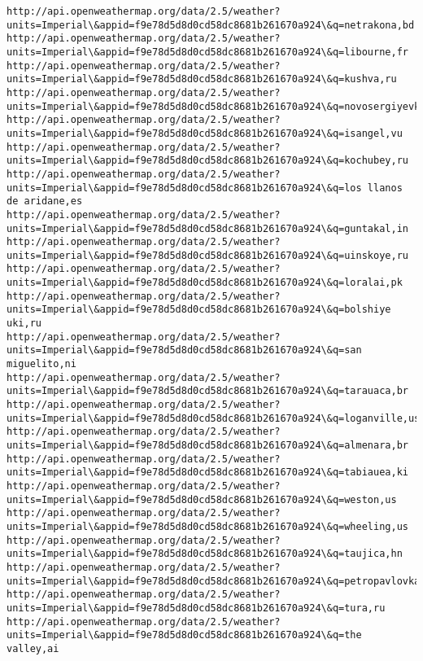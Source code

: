 \documentclass[11pt]{article}
\begin{document}
\begin{Verbatim}[commandchars=\\\{\}]
http://api.openweathermap.org/data/2.5/weather?units=Imperial\&appid=f9e78d5d8d0cd58dc8681b261670a924\&q=netrakona,bd
http://api.openweathermap.org/data/2.5/weather?units=Imperial\&appid=f9e78d5d8d0cd58dc8681b261670a924\&q=libourne,fr
http://api.openweathermap.org/data/2.5/weather?units=Imperial\&appid=f9e78d5d8d0cd58dc8681b261670a924\&q=kushva,ru
http://api.openweathermap.org/data/2.5/weather?units=Imperial\&appid=f9e78d5d8d0cd58dc8681b261670a924\&q=novosergiyevka,ru
http://api.openweathermap.org/data/2.5/weather?units=Imperial\&appid=f9e78d5d8d0cd58dc8681b261670a924\&q=isangel,vu
http://api.openweathermap.org/data/2.5/weather?units=Imperial\&appid=f9e78d5d8d0cd58dc8681b261670a924\&q=kochubey,ru
http://api.openweathermap.org/data/2.5/weather?units=Imperial\&appid=f9e78d5d8d0cd58dc8681b261670a924\&q=los llanos de aridane,es
http://api.openweathermap.org/data/2.5/weather?units=Imperial\&appid=f9e78d5d8d0cd58dc8681b261670a924\&q=guntakal,in
http://api.openweathermap.org/data/2.5/weather?units=Imperial\&appid=f9e78d5d8d0cd58dc8681b261670a924\&q=uinskoye,ru
http://api.openweathermap.org/data/2.5/weather?units=Imperial\&appid=f9e78d5d8d0cd58dc8681b261670a924\&q=loralai,pk
http://api.openweathermap.org/data/2.5/weather?units=Imperial\&appid=f9e78d5d8d0cd58dc8681b261670a924\&q=bolshiye uki,ru
http://api.openweathermap.org/data/2.5/weather?units=Imperial\&appid=f9e78d5d8d0cd58dc8681b261670a924\&q=san miguelito,ni
http://api.openweathermap.org/data/2.5/weather?units=Imperial\&appid=f9e78d5d8d0cd58dc8681b261670a924\&q=tarauaca,br
http://api.openweathermap.org/data/2.5/weather?units=Imperial\&appid=f9e78d5d8d0cd58dc8681b261670a924\&q=loganville,us
http://api.openweathermap.org/data/2.5/weather?units=Imperial\&appid=f9e78d5d8d0cd58dc8681b261670a924\&q=almenara,br
http://api.openweathermap.org/data/2.5/weather?units=Imperial\&appid=f9e78d5d8d0cd58dc8681b261670a924\&q=tabiauea,ki
http://api.openweathermap.org/data/2.5/weather?units=Imperial\&appid=f9e78d5d8d0cd58dc8681b261670a924\&q=weston,us
http://api.openweathermap.org/data/2.5/weather?units=Imperial\&appid=f9e78d5d8d0cd58dc8681b261670a924\&q=wheeling,us
http://api.openweathermap.org/data/2.5/weather?units=Imperial\&appid=f9e78d5d8d0cd58dc8681b261670a924\&q=taujica,hn
http://api.openweathermap.org/data/2.5/weather?units=Imperial\&appid=f9e78d5d8d0cd58dc8681b261670a924\&q=petropavlovka,ru
http://api.openweathermap.org/data/2.5/weather?units=Imperial\&appid=f9e78d5d8d0cd58dc8681b261670a924\&q=tura,ru
http://api.openweathermap.org/data/2.5/weather?units=Imperial\&appid=f9e78d5d8d0cd58dc8681b261670a924\&q=the valley,ai

\end{Verbatim}
\end{document}
